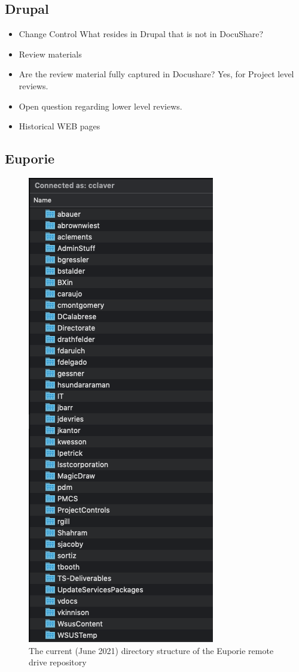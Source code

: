 \subsection{Drupal}

\begin{itemize}
	\item Change Control What resides in Drupal that is not in DocuShare?
	\item Review materials
	\item Are the review material fully captured in Docushare?  Yes, for Project level reviews.
	\item Open question regarding lower level reviews.
	\item Historical WEB pages
\end{itemize}

\subsection{Euporie}

\begin{figure}
\begin{center}
  \includegraphics[scale=0.5]{Figures/EuporieDirectory.png}
\end{center}
\caption{\label{fig:EuporyDirectory} The current (June 2021) directory structure of the Euporie remote drive repository}
\end{figure}

